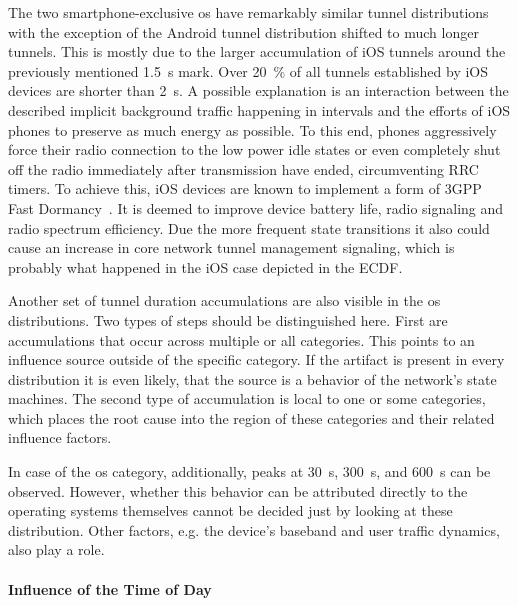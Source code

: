 The two smartphone-exclusive \gls{os} have remarkably similar tunnel distributions with the exception of the Android tunnel distribution shifted to much longer tunnels. This is mostly due to the larger accumulation of iOS tunnels around the previously mentioned \SI{1.5}{\second} mark. Over \SI{20}{\percent} of all tunnels established by iOS devices are shorter than \SI{2}{\second}. A possible explanation is an interaction between the described implicit background traffic happening in intervals and the efforts of iOS phones to preserve as much energy as possible. 
To this end, phones aggressively force their radio connection to the low power idle states or even completely shut off the radio immediately after transmission have ended, circumventing \gls{RRC} timers. To achieve this, iOS devices are known to implement a form of \gls{3GPP} Fast Dormancy~\cite{gsma2011fdbestpract}. It is deemed to improve device battery life, radio signaling and radio spectrum efficiency. Due the more frequent state transitions it also could cause an increase in core network tunnel management signaling, which is probably what happened in the iOS case depicted in the \gls{ECDF}.

Another set of tunnel duration accumulations are also visible in the \gls{os} distributions. Two types of steps should be distinguished here. First are accumulations that occur across multiple or all categories. This points to an influence source outside of the specific category. If the artifact is present in every distribution it is even likely, that the source is a behavior of the network's state machines. The second type of accumulation is local to one or some categories, which places the root cause into the region of these categories and their related influence factors. 

In case of the \gls{os} category, additionally, peaks at \SI{30}{\second}, \SI{300}{\second}, and \SI{600}{\second} can be observed. However, whether this behavior can be attributed directly to the operating systems themselves cannot be decided just by looking at these distribution. Other factors, e.g. the device's baseband and user traffic dynamics, also play a role. 


\paragraph{Influence of the Time of Day}


